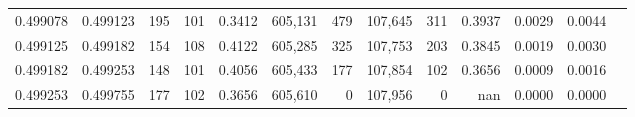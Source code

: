\begin{tabular}{rrrrrrrrrrrrr}
0.499078 & 0.499123 &   195 & 101 &                                     0.3412 & 605,131 &     479 & 107,645 &     311 & 0.3937 & 0.0029 & 0.0044 \\
0.499125 & 0.499182 &   154 & 108 &                                     0.4122 & 605,285 &     325 & 107,753 &     203 & 0.3845 & 0.0019 & 0.0030 \\
0.499182 & 0.499253 &   148 & 101 &                                     0.4056 & 605,433 &     177 & 107,854 &     102 & 0.3656 & 0.0009 & 0.0016 \\
0.499253 & 0.499755 &   177 & 102 &                                     0.3656 & 605,610 &       0 & 107,956 &       0 &    nan & 0.0000 & 0.0000 \\
\bottomrule
\end{tabular}
